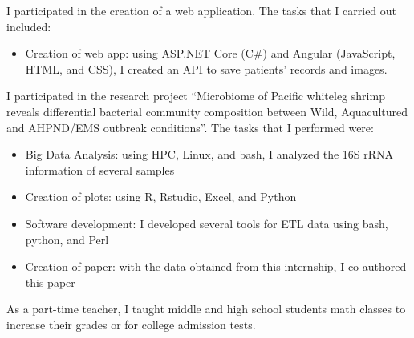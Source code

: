 \documentclass[11pt,a4paper,]{awesome-cv}
\providecommand{\tightlist}{%
	\setlength{\itemsep}{0pt}\setlength{\parskip}{0pt}}
\begin{document}
\begin{cventries}
    \vspace{-4.0mm}
\end{cventries}

I participated in the creation of a web application. The tasks that I
carried out included:

\begin{itemize}
\tightlist
\item
  Creation of web app: using ASP.NET Core (C\#) and Angular (JavaScript,
  HTML, and CSS), I created an API to save patients' records and images.
\end{itemize}

\newpage

\begin{cventries}
    \vspace{-4.0mm}
\end{cventries}

I participated in the research project ``Microbiome of Pacific whiteleg
shrimp reveals differential bacterial community composition between
Wild, Aquacultured and AHPND/EMS outbreak conditions''. The tasks that I
performed were:

\begin{itemize}
\tightlist
\item
  Big Data Analysis: using HPC, Linux, and bash, I analyzed the 16S rRNA
  information of several samples
\item
  Creation of plots: using R, Rstudio, Excel, and Python
\item
  Software development: I developed several tools for ETL data using
  bash, python, and Perl
\item
  Creation of paper: with the data obtained from this internship, I
  co-authored this paper
\end{itemize}

\begin{cventries}
    \vspace{-4.0mm}
\end{cventries}

As a part-time teacher, I taught middle and high school students math
classes to increase their grades or for college admission tests.
\end{document}
